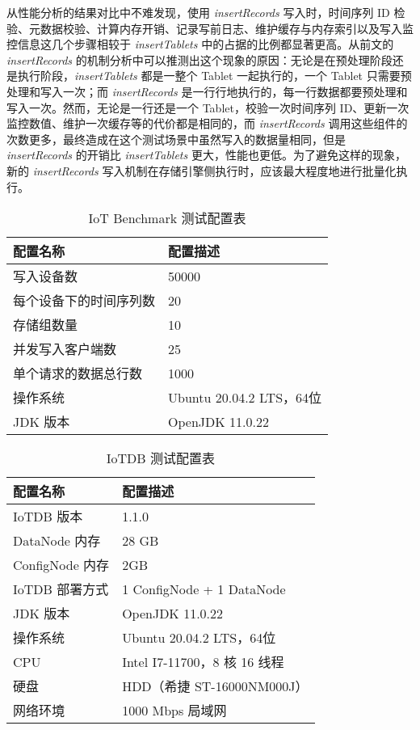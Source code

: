 从性能分析的结果对比中不难发现，使用 \emph{insertRecords} 写入时，时间序列 ID 检验、元数据校验、计算内存开销、记录写前日志、维护缓存与内存索引以及写入监控信息这几个步骤相较于 \emph{insertTablets} 中的占据的比例都显著更高。从前文的 \emph{insertRecords} 的机制分析中可以推测出这个现象的原因：无论是在预处理阶段还是执行阶段，\emph{insertTablets} 都是一整个 Tablet 一起执行的，一个 Tablet 只需要预处理和写入一次；而 \emph{insertRecords} 是一行行地执行的，每一行数据都要预处理和写入一次。然而，无论是一行还是一个 Tablet，校验一次时间序列 ID、更新一次监控数值、维护一次缓存等的代价都是相同的，而 \emph{insertRecords} 调用这些组件的次数更多，最终造成在这个测试场景中虽然写入的数据量相同，但是 \emph{insertRecords} 的开销比 \emph{insertTablets} 更大，性能也更低。为了避免这样的现象，新的 \emph{insertRecords} 写入机制在存储引擎侧执行时，应该最大程度地进行批量化执行。
\begin{table}
  \caption{IoT Benchmark 测试配置表}
  \centering
  \begin{tabular}{ll}
  \toprule
  配置名称 & 配置描述 \\
  \midrule
      写入设备数 &  50000 \\ 
      每个设备下的时间序列数 & 20 \\ 
      存储组数量 & 10 \\ 
      并发写入客户端数 & 25 \\ 
      单个请求的数据总行数 &  1000 \\ 
      操作系统 & Ubuntu 20.04.2 LTS，64位 \\
      JDK 版本 & OpenJDK 11.0.22 \\
  \bottomrule
  \end{tabular}
  \label{tabular:insert-records-profile-benchmark-config}
\end{table}

\begin{table}
  \caption{IoTDB 测试配置表}
  \centering
  \begin{tabular}{ll}
  \toprule
  配置名称 & 配置描述 \\
  \midrule
      IoTDB 版本 &  1.1.0 \\ 
      DataNode 内存 & 28 GB \\ 
      ConfigNode 内存 & 2GB \\ 
      IoTDB 部署方式 & 1 ConfigNode + 1 DataNode \\
      JDK 版本 & OpenJDK 11.0.22 \\
      操作系统 & Ubuntu 20.04.2 LTS，64位 \\
      CPU &  Intel I7-11700，8 核 16 线程 \\ 
      硬盘 & HDD（希捷 ST-16000NM000J） \\ 
      网络环境 & 1000 Mbps 局域网 \\
  \bottomrule
  \end{tabular}
  \label{tabular:insert-records-profile-iotdb-config}
\end{table}


